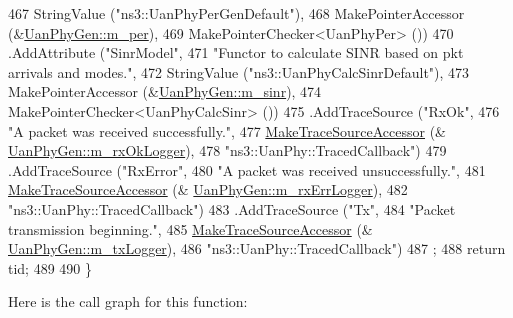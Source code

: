 \begin{DoxyCode}
467                    StringValue (\textcolor{stringliteral}{"ns3::UanPhyPerGenDefault"}),
468                    MakePointerAccessor (&\hyperlink{classns3_1_1UanPhyGen_a14a4a149970cb2d9f0041a52e7934896}{UanPhyGen::m\_per}),
469                    MakePointerChecker<UanPhyPer> ())
470     .AddAttribute (\textcolor{stringliteral}{"SinrModel"},
471                    \textcolor{stringliteral}{"Functor to calculate SINR based on pkt arrivals and modes."},
472                    StringValue (\textcolor{stringliteral}{"ns3::UanPhyCalcSinrDefault"}),
473                    MakePointerAccessor (&\hyperlink{classns3_1_1UanPhyGen_a52607020671ae668cb8b01d9ff6d7422}{UanPhyGen::m\_sinr}),
474                    MakePointerChecker<UanPhyCalcSinr> ())
475     .AddTraceSource (\textcolor{stringliteral}{"RxOk"},
476                      \textcolor{stringliteral}{"A packet was received successfully."},
477                      \hyperlink{group__tracing_gab21a770b9855af4e8f69f7531ea4a6b0}{MakeTraceSourceAccessor} (&
      \hyperlink{classns3_1_1UanPhyGen_a151fedae9333b5fdfa5a88ae2fb459d4}{UanPhyGen::m\_rxOkLogger}),
478                      \textcolor{stringliteral}{"ns3::UanPhy::TracedCallback"})
479     .AddTraceSource (\textcolor{stringliteral}{"RxError"},
480                      \textcolor{stringliteral}{"A packet was received unsuccessfully."},
481                      \hyperlink{group__tracing_gab21a770b9855af4e8f69f7531ea4a6b0}{MakeTraceSourceAccessor} (&
      \hyperlink{classns3_1_1UanPhyGen_a31e8c081996ccafe5a8f6ceeaddd7542}{UanPhyGen::m\_rxErrLogger}),
482                      \textcolor{stringliteral}{"ns3::UanPhy::TracedCallback"})
483     .AddTraceSource (\textcolor{stringliteral}{"Tx"},
484                      \textcolor{stringliteral}{"Packet transmission beginning."},
485                      \hyperlink{group__tracing_gab21a770b9855af4e8f69f7531ea4a6b0}{MakeTraceSourceAccessor} (&
      \hyperlink{classns3_1_1UanPhyGen_a18fa0133aac0f1187120ab09243b25e3}{UanPhyGen::m\_txLogger}),
486                      \textcolor{stringliteral}{"ns3::UanPhy::TracedCallback"})
487   ;
488   \textcolor{keywordflow}{return} tid;
489 
490 \}
\end{DoxyCode}


Here is the call graph for this function\+:



